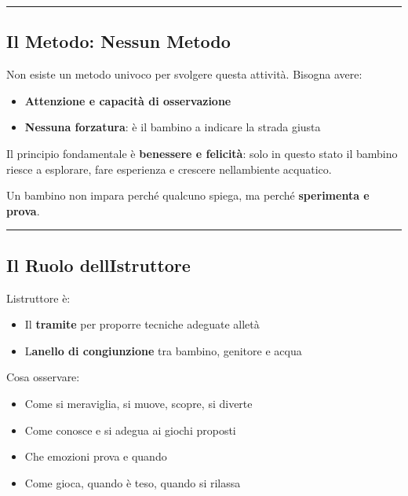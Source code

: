 \documentclass[a4paper,11pt]{article}
\providecommand{\tightlist}{%
  \setlength{\itemsep}{0pt}\setlength{\parskip}{0pt}}
\begin{document}
\begin{center}\rule{0.5\linewidth}{0.5pt}\end{center}

\subsection{Il Metodo: Nessun Metodo}\label{il-metodo-nessun-metodo}

Non esiste un metodo univoco per svolgere questa attività. Bisogna
avere:

\begin{itemize}
      \tightlist
      \item
            \textbf{Attenzione e capacità di osservazione}
      \item
            \textbf{Nessuna forzatura}: è il bambino a indicare la strada giusta
\end{itemize}

Il principio fondamentale è \textbf{benessere e felicità}: solo in
questo stato il bambino riesce a esplorare, fare esperienza e crescere
nell\textquotesingle ambiente acquatico.

Un bambino non impara perché qualcuno spiega, ma perché
\textbf{sperimenta e prova}.

\begin{center}\rule{0.5\linewidth}{0.5pt}\end{center}

\subsection{Il Ruolo
      dell\textquotesingle Istruttore}\label{il-ruolo-dellistruttore}

L\textquotesingle istruttore è:

\begin{itemize}
      \tightlist
      \item
            Il \textbf{tramite} per proporre tecniche adeguate
            all\textquotesingle età
      \item
            L\textquotesingle{}\textbf{anello di congiunzione} tra bambino,
            genitore e acqua
\end{itemize}

Cosa osservare:

\begin{itemize}
      \tightlist
      \item
            Come si meraviglia, si muove, scopre, si diverte
      \item
            Come conosce e si adegua ai giochi proposti
      \item
            Che emozioni prova e quando
      \item
            Come gioca, quando è teso, quando si rilassa
\end{itemize}
\end{document}
